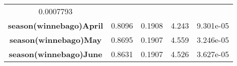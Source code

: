 \documentclass[]{book}
\theoremstyle{definition}
\theoremstyle{definition}
\theoremstyle{remark}
\begin{document}
\begin{longtable}[c]{@{}ccccc@{}}
\begin{minipage}[t]{0.11\columnwidth}
0.0007793
\strut\end{minipage}\tabularnewline
\begin{minipage}[t]{0.37\columnwidth}\centering\strut
\textbf{season(winnebago)April}
\strut\end{minipage} &
\begin{minipage}[t]{0.12\columnwidth}\centering\strut
0.8096
\strut\end{minipage} &
\begin{minipage}[t]{0.14\columnwidth}\centering\strut
0.1908
\strut\end{minipage} &
\begin{minipage}[t]{0.11\columnwidth}\centering\strut
4.243
\strut\end{minipage} &
\begin{minipage}[t]{0.11\columnwidth}\centering\strut
9.301e-05
\strut\end{minipage}\tabularnewline
\begin{minipage}[t]{0.37\columnwidth}\centering\strut
\textbf{season(winnebago)May}
\strut\end{minipage} &
\begin{minipage}[t]{0.12\columnwidth}\centering\strut
0.8695
\strut\end{minipage} &
\begin{minipage}[t]{0.14\columnwidth}\centering\strut
0.1907
\strut\end{minipage} &
\begin{minipage}[t]{0.11\columnwidth}\centering\strut
4.559
\strut\end{minipage} &
\begin{minipage}[t]{0.11\columnwidth}\centering\strut
3.246e-05
\strut\end{minipage}\tabularnewline
\begin{minipage}[t]{0.37\columnwidth}\centering\strut
\textbf{season(winnebago)June}
\strut\end{minipage} &
\begin{minipage}[t]{0.12\columnwidth}\centering\strut
0.8631
\strut\end{minipage} &
\begin{minipage}[t]{0.14\columnwidth}\centering\strut
0.1907
\strut\end{minipage} &
\begin{minipage}[t]{0.11\columnwidth}\centering\strut
4.526
\strut\end{minipage} &
\begin{minipage}[t]{0.11\columnwidth}\centering\strut
3.627e-05
\strut\end{minipage}\tabularnewline

\end{longtable}
\end{document}
